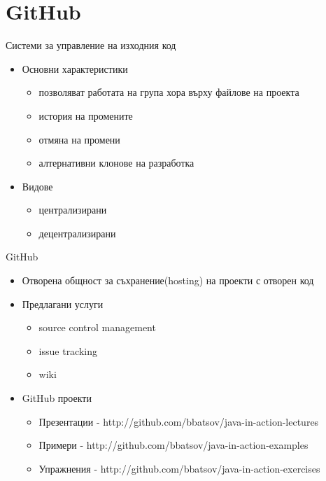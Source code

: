 \documentclass{beamer}
\begin{document}
\section{GitHub}
\begin{frame}{Системи за управление на изходния код}
  \transdissolve
  \begin{itemize}
  \item Основни характеристики
    \begin{itemize}
      \item позволяват работата на група хора върху файлове на проекта
      \item история на промените
      \item отмяна на промени
      \item алтернативни клонове на разработка
    \end{itemize}
  \item Видове
    \begin{itemize}
      \item централизирани
      \item децентрализирани
    \end{itemize}
  \end{itemize}
\end{frame}

\begin{frame}{GitHub}
  \transdissolve
  \begin{itemize}
    \item Отворена общност за съхранение(hosting) на
    проекти с отворен код
    \item Предлагани услуги
      \begin{itemize}
        \item source control management
        \item issue tracking
        \item wiki
      \end{itemize}
    \item GitHub проекти
      \begin{itemize}
      \item Презентации -
        http://github.com/bbatsov/java-in-action-lectures 
        \item Примери -
          http://github.com/bbatsov/java-in-action-examples
        \item Упражнения -
          http://github.com/bbatsov/java-in-action-exercises
      \end{itemize}
  \end{itemize}
\end{frame}
\end{document}
